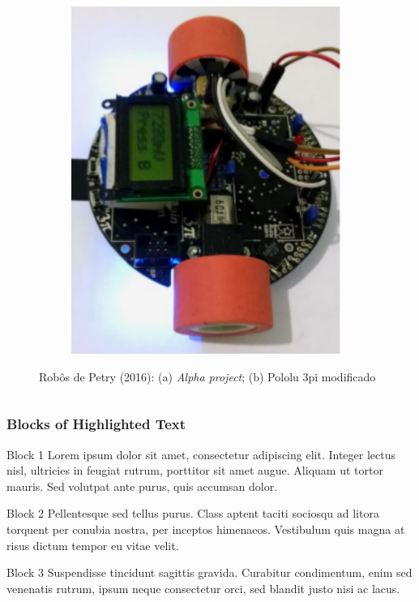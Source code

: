 \begin{frame}
\begin{columns}
\begin{figure}[h]
\begin{subfigure}[b]{0.3\textwidth}
         \includegraphics[width=1\textwidth,height=0.4\textheight]{Figuras/polulumod.png}
         \caption{\centering \label{fig:pololumarcio}}
     \end{subfigure}
	\caption{Robôs de Petry (2016): (a) \textit{Alpha project}; (b) Pololu 3pi modificado}
 \end{figure}
	
\end{columns}
\end{frame}


\begin{frame}
\frametitle{Blocks of Highlighted Text}
\begin{block}{Block 1}
Lorem ipsum dolor sit amet, consectetur adipiscing elit. Integer lectus nisl, ultricies in feugiat rutrum, porttitor sit amet augue. Aliquam ut tortor mauris. Sed volutpat ante purus, quis accumsan dolor.
\end{block}

\begin{block}{Block 2}
Pellentesque sed tellus purus. Class aptent taciti sociosqu ad litora torquent per conubia nostra, per inceptos himenaeos. Vestibulum quis magna at risus dictum tempor eu vitae velit.
\end{block}

\begin{block}{Block 3}
Suspendisse tincidunt sagittis gravida. Curabitur condimentum, enim sed venenatis rutrum, ipsum neque consectetur orci, sed blandit justo nisi ac lacus.
\end{block}
\end{frame}

